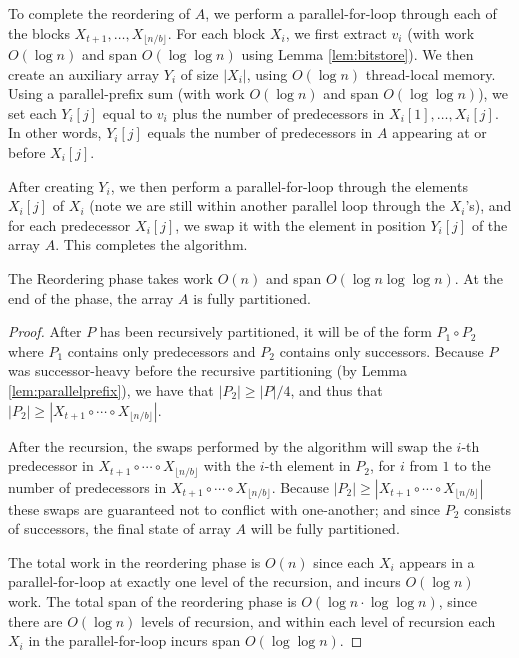 \documentclass[twoside,leqno,twocolumn]{article}
\begin{document}
To complete the reordering of $A$, we perform a parallel-for-loop
through each of the blocks $X_{t + 1}, \ldots, X_{\lfloor n / b \rfloor}$. For each block
$X_i$, we first extract $v_i$ (with work $O(\log n)$ and span $O(\log
\log n)$ using Lemma \ref{lem:bitstore}). We then create an auxiliary
array $Y_i$ of size $|X_i|$, using $O(\log n)$ thread-local
memory. Using a parallel-prefix sum (with work $O(\log n)$ and span
$O(\log \log n)$), we set each $Y_i[j]$ equal to $v_i$ plus the number
of predecessors in $X_i[1], \ldots, X_i[j]$. In other words, $Y_i[j]$
equals the number of predecessors in $A$ appearing at or before
$X_i[j]$.

After creating $Y_i$, we then perform a parallel-for-loop through the
elements $X_i[j]$ of $X_i$ (note we are still within another parallel
loop through the $X_i$'s), and for each predecessor $X_i[j]$, we swap
it with the element in position $Y_i[j]$ of the array $A$. This
completes the algorithm.

\begin{lemma}
 The Reordering phase takes work $O(n)$ and span $O(\log n \log \log
 n)$. At the end of the phase, the array $A$ is fully partitioned.
\end{lemma}
\begin{proof}
  After $P$ has been recursively partitioned, it will be of the form
  $P_1 \circ P_2$ where $P_1$ contains only predecessors and $P_2$
  contains only successors. Because $P$ was successor-heavy before the
  recursive partitioning (by Lemma \ref{lem:parallelprefix}), we have
  that $|P_2| \ge |P| / 4$, and thus that
  $|P_2| \ge |X_{t + 1} \circ \cdots \circ X_{\lfloor n / b
    \rfloor}|$.

After the recursion, the swaps performed by the algorithm will swap
the $i$-th predecessor in $X_{t + 1} \circ \cdots \circ X_{\lfloor n /
  b \rfloor}$ with the $i$-th element in $P_2$, for $i$ from $1$ to
the number of predecessors in $X_{t + 1} \circ \cdots \circ X_{\lfloor
  n / b \rfloor}$. Because $|P_2| \ge |X_{t + 1} \circ \cdots \circ
X_{\lfloor n / b \rfloor}|$ these swaps are guaranteed not to conflict
with one-another; and since $P_2$ consists of successors, the final
state of array $A$ will be fully partitioned.

The total work in the reordering phase is $O(n)$ since each $X_i$
appears in a parallel-for-loop at exactly one level of the recursion,
and incurs $O(\log n)$ work. The total span of the reordering phase is
$O(\log n \cdot \log \log n)$, since there are $O(\log n)$ levels of
recursion, and within each level of recursion each $X_i$ in the
parallel-for-loop incurs span $O(\log \log n)$. 
\end{proof}
\end{document}
